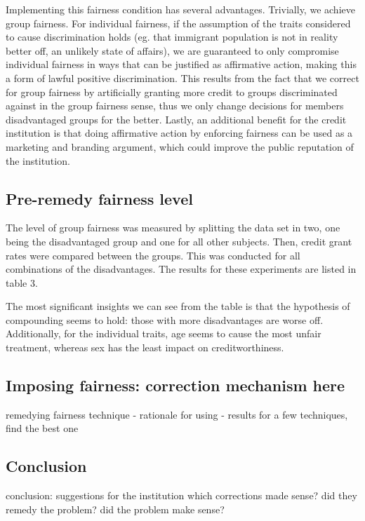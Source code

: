 \documentclass{article}
\begin{document}
Implementing this fairness condition has several advantages. Trivially, we achieve group fairness. For individual fairness,
if the assumption of the traits considered to cause discrimination holds (eg. that immigrant population is not 
in reality better off, an unlikely state of affairs), we are guaranteed to only compromise individual fairness in 
ways that can be justified as affirmative action, making this a form of lawful positive discrimination.
This results from the fact that we correct for group fairness by artificially granting more credit to 
groups discriminated against in the group fairness sense, thus we only change decisions for members disadvantaged groups for the better.
Lastly, an additional benefit for the credit institution is that doing affirmative action by enforcing fairness
can be used as a marketing and branding argument, which could improve the public reputation of the institution.

\subsection*{Pre-remedy fairness level}

The level of group fairness was measured by splitting the data set in two, 
one being the disadvantaged group and one for all other subjects. Then, 
credit grant rates were compared between the groups. This was conducted for all 
combinations of the disadvantages. The results for these experiments are listed in table 3. \cite{stanley}

The most significant insights we can see from the table is that the hypothesis of compounding seems to hold:
those with more disadvantages are worse off. 
Additionally, for the individual traits,  age seems 
to cause the most unfair treatment, whereas sex has the least impact on creditworthiness.

\subsection*{Imposing fairness: correction mechanism here}
remedying fairness 
technique - rationale for using - results
for a few techniques, find the best one

\subsection*{Conclusion}

conclusion: suggestions for the institution
which corrections made sense? did they remedy the problem?
did the problem make sense?
\end{document}
